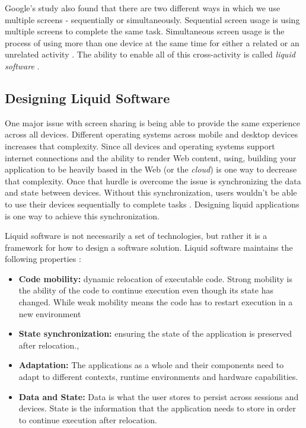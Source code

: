 \documentclass[12pt]{article}
\begin{document}
Google's study also found that there are two different ways in which we use multiple screens - sequentially or simultaneously.  Sequential screen usage is using multiple screens to complete the same task.  Simultaneous screen usage is the process of using more than one device at the same time for either a related or an unrelated activity \cite{google_multi_screen}.  The ability to enable all of this cross-activity is called \textit{liquid software} \cite{liquid_web}.

\subsection{Designing Liquid Software}
One major issue with screen sharing is being able to provide the same experience across all devices.  Different operating systems across mobile and desktop devices increases that complexity.  Since all devices and operating systems support internet connections and the ability to render Web content, using, building your application to be heavily based in the Web (or the \textit{cloud}) is one way to decrease that complexity.  Once that hurdle is overcome the issue is synchronizing the data and state between devices.  Without this synchronization, users wouldn't be able to use their devices sequentially to complete tasks \cite{liquid_web}.  Designing liquid applications is one way to achieve this synchronization.

Liquid software is not necessarily a set of technologies, but rather it is a framework for how to design a software solution.  Liquid software maintains the following properties \cite{liquid_web}:

\begin{itemize}
  \item {\textbf{Code mobility: }dynamic relocation of executable code.  Strong mobility is the ability of the code to continue execution even though its state has changed.  While weak mobility means the code has to restart execution in a new environment}
  \item {\textbf{State synchronization: }ensuring the state of the application is preserved after relocation.},
  \item {\textbf{Adaptation: }The applications as a whole and their components need to adapt to different contexts, runtime environments and hardware capabilities}.
  \item {\textbf{Data and State: }Data is what the user stores to persist across sessions and devices.  State is the information that the application needs to store in order to continue execution after relocation}.
\end{itemize}
\end{document}

